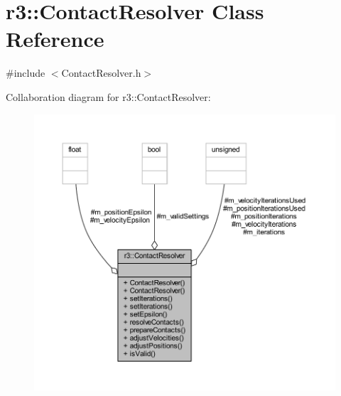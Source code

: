 \hypertarget{classr3_1_1_contact_resolver}{}\section{r3\+:\+:Contact\+Resolver Class Reference}
\label{classr3_1_1_contact_resolver}


{\ttfamily \#include $<$Contact\+Resolver.\+h$>$}



Collaboration diagram for r3\+:\+:Contact\+Resolver\+:\nopagebreak
\begin{figure}[H]
\begin{center}
\leavevmode
\includegraphics[width=350pt]{classr3_1_1_contact_resolver__coll__graph}
\end{center}
\end{figure}
